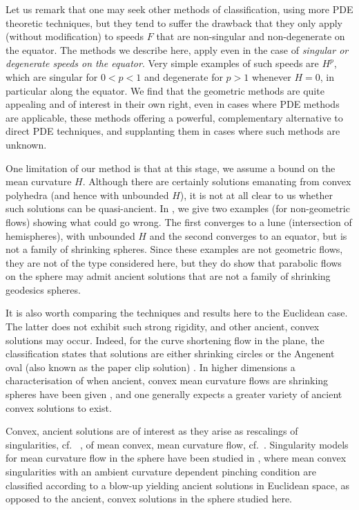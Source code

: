 \documentclass{amsart}
\begin{document}
Let us remark that one may seek other methods of classification, using more PDE theoretic techniques, but they tend to suffer the drawback that they only apply (without modification) to speeds \(F\) that are non-singular and non-degenerate on the equator. The methods we describe here, apply even in the case of \emph{singular or degenerate speeds on the equator}. Very simple examples of such speeds are \(H^p\), which are singular for \(0 < p < 1\) and degenerate for \(p > 1\) whenever \(H = 0\), in particular along the equator. We find that the geometric methods are quite appealing and of interest in their own right, even in cases where PDE methods are applicable, these methods offering a powerful, complementary alternative to direct PDE techniques, and supplanting them in cases where such methods are unknown.

One limitation of our method is that at this stage, we assume a bound on the mean curvature \(H\). Although there are certainly solutions emanating from convex polyhedra (and hence with unbounded \(H\)), it is not at all clear to us whether such solutions can be quasi-ancient. In , we give two examples (for non-geometric flows) showing what could go wrong. The first converges to a lune (intersection of hemispheres), with unbounded \(H\) and the second converges to an equator, but is not a family of shrinking spheres. Since these examples are not geometric flows, they are not of the type considered here, but they do show that parabolic flows on the sphere may admit ancient solutions that are not a family of shrinking geodesics spheres.

It is also worth comparing the techniques and results here to the Euclidean case. The latter does not exhibit such strong rigidity, and other ancient, convex solutions may occur. Indeed, for the curve shortening flow in the plane, the classification \cite{DaskalopoulosHamiltonSesum:/2010} states that solutions are either shrinking circles or the Angenent oval (also known as the paper clip solution) \cite{Angenent:/1992}. In higher dimensions a characterisation of when ancient, convex mean curvature flows are shrinking spheres have been given \cite{HuiskenSinestrari:10/2015,HaslhoferHershkovits:08/2013}, and one generally expects a greater variety of ancient convex solutions to exist.

Convex, ancient solutions are of interest as they arise as rescalings of singularities, cf.~ \cite{HuiskenSinestrari:01/1999}, of mean convex, mean curvature flow, cf.~\cite{HuiskenSinestrari:09/1999, White:10/2002}. Singularity models for mean curvature flow in the sphere have been studied in \cite{Nguyen:07/2015}, where mean convex singularities with an ambient curvature dependent pinching condition are classified according to a blow-up yielding ancient solutions in Euclidean space, as opposed to the ancient, convex solutions in the sphere studied here.
\end{document}
